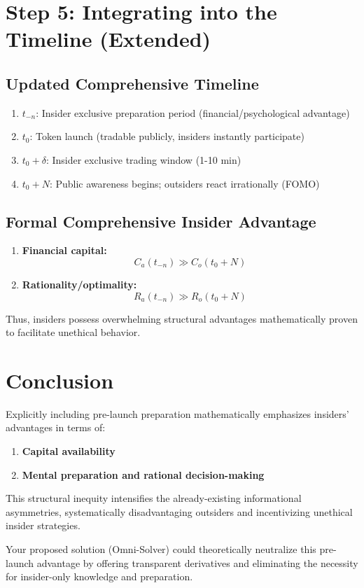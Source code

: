 \documentclass{article}
\begin{document}
\section{Step 5: Integrating into the Timeline (Extended)}

\subsection*{Updated Comprehensive Timeline}

\begin{enumerate}
    \item \textbf{$t_{-n}$}: Insider exclusive preparation period (financial/psychological advantage)
    \item \textbf{$t_0$}: Token launch (tradable publicly, insiders instantly participate)
    \item \textbf{$t_0 + \delta$}: Insider exclusive trading window (1-10 min)
    \item \textbf{$t_0 + N$}: Public awareness begins; outsiders react irrationally (FOMO)
\end{enumerate}

\subsection*{Formal Comprehensive Insider Advantage}

\begin{enumerate}
    \item \textbf{Financial capital:}
        \[ C_a(t_{-n}) \gg C_o(t_0 + N) \]
    \item \textbf{Rationality/optimality:}
        \[ R_a(t_{-n}) \gg R_o(t_0 + N) \]
\end{enumerate}

Thus, insiders possess overwhelming structural advantages mathematically proven to facilitate unethical behavior.

\section*{Conclusion}

Explicitly including pre-launch preparation mathematically emphasizes insiders' advantages in terms of:

\begin{enumerate}
    \item \textbf{Capital availability}
    \item \textbf{Mental preparation and rational decision-making}
\end{enumerate}

This structural inequity intensifies the already-existing informational asymmetries, systematically disadvantaging outsiders and incentivizing unethical insider strategies.

Your proposed solution (Omni-Solver) could theoretically neutralize this pre-launch advantage by offering transparent derivatives and eliminating the necessity for insider-only knowledge and preparation.
\end{document}
